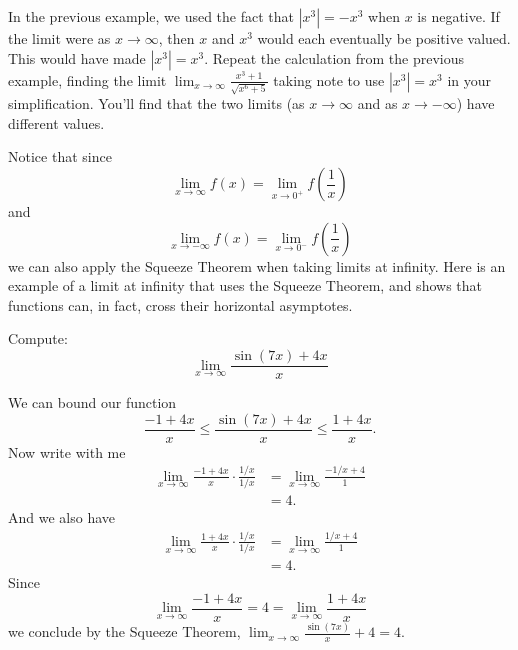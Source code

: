 \documentclass{ximera}
\begin{document}
In the previous example, we used the fact that $|x^3|= -x^3$ when $x$ is negative. If the limit were as $x\to \infty$, then $x$ and $x^3$ would each 
eventually be positive valued. This would have made $|x^3|=x^3$. Repeat the calculation from the previous example, finding the limit
$\displaystyle \lim_{x\to \infty} \frac{x^3+1}{\sqrt{x^6+5}}$ taking note to use $|x^3|=x^3$ in your simplification. 
You'll find that the two limits (as $x\to \infty$ and as $x \to -\infty$) have different values.






Notice that since
\[
\lim_{x\to \infty} f(x) = \lim_{x\to 0^+} f\left(\frac{1}{x}\right)
\]
and
\[
\lim_{x\to -\infty} f(x) = \lim_{x\to 0^-} f\left(\frac{1}{x}\right)
\]
we can also apply the Squeeze Theorem when taking limits at infinity.
Here is an example of a limit at infinity that uses the Squeeze
Theorem, and shows that functions can, in fact, cross their horizontal
asymptotes.


\begin{example}
Compute:
\[
\lim_{x\to \infty} \frac{\sin(7x)+4x}{x}
\]
\begin{image}
\end{image}

\begin{explanation}
We can bound our function
\[
\frac{-1+4x}{x} \le \frac{\sin(7x)+4x}{x} \le \frac{1+4x}{x}.
\]
Now write with me
\begin{align*}
\lim_{x\to\infty}\frac{-1+4x}{x} \cdot \frac{1/x}{1/x} &= \lim_{x\to\infty}\frac{-1/x+4}{1}\\
&=4.
\end{align*}
And we also have
\begin{align*}
\lim_{x\to\infty}\frac{1+4x}{x} \cdot \frac{1/x}{1/x} &= \lim_{x\to\infty}\frac{1/x+4}{1}\\
&=4.
\end{align*}
Since 
\[
\lim_{x\to \infty} \frac{-1+4x}{x}  = 4 = \lim_{x\to \infty}\frac{1+4x}{x} 
\] 
we conclude by the Squeeze Theorem,
$\lim_{x\to\infty}\frac{\sin(7x)}{x}+4 = 4$.
\end{explanation}
\end{example}
\end{document}
